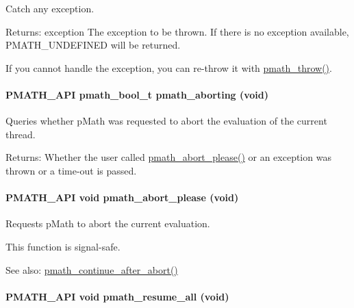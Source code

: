 Catch any exception. 

\begin{Desc}
\item[Returns:]exception The exception to be thrown. If there is no exception available, PMATH\_\-UNDEFINED will be returned.\end{Desc}
If you cannot handle the exception, you can re-throw it with \hyperlink{group__threads_gf1aa6d6603faaa4120207be6108e356c}{pmath\_\-throw()}. \hypertarget{group__threads_gb75a9c87401fddb42b297ddb0495415f}{
\paragraph[{pmath\_\-aborting}]{\setlength{\rightskip}{0pt plus 5cm}PMATH\_\-API {\bf pmath\_\-bool\_\-t} pmath\_\-aborting (void)}\hfill}
\label{group__threads_gb75a9c87401fddb42b297ddb0495415f}


Queries whether pMath was requested to abort the evaluation of the current thread. 

\begin{Desc}
\item[Returns:]Whether the user called \hyperlink{group__threads_g84e45036b76764def6390af12d2070bf}{pmath\_\-abort\_\-please()} or an exception was thrown or a time-out is passed. \end{Desc}
\hypertarget{group__threads_g84e45036b76764def6390af12d2070bf}{
\paragraph[{pmath\_\-abort\_\-please}]{\setlength{\rightskip}{0pt plus 5cm}PMATH\_\-API void pmath\_\-abort\_\-please (void)}\hfill}
\label{group__threads_g84e45036b76764def6390af12d2070bf}


Requests pMath to abort the current evaluation. 

This function is signal-safe.

\begin{Desc}
\item[See also:]\hyperlink{group__frontend_g4934c2dc54f852627f8b291543a21e43}{pmath\_\-continue\_\-after\_\-abort()} \end{Desc}
\hypertarget{group__threads_gccf30e13ea6e65136fca6294267f00c2}{
\paragraph[{pmath\_\-resume\_\-all}]{\setlength{\rightskip}{0pt plus 5cm}PMATH\_\-API void pmath\_\-resume\_\-all (void)}\hfill}
\label{group__threads_gccf30e13ea6e65136fca6294267f00c2}


